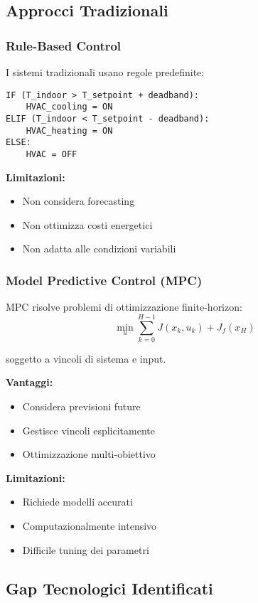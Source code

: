 \documentclass[12pt,a4paper,twoside]{report}
\begin{document}
\subsection{Approcci Tradizionali}

\subsubsection{Rule-Based Control}

I sistemi tradizionali usano regole predefinite:
\begin{lstlisting}
IF (T_indoor > T_setpoint + deadband):
    HVAC_cooling = ON
ELIF (T_indoor < T_setpoint - deadband):
    HVAC_heating = ON  
ELSE:
    HVAC = OFF
\end{lstlisting}

\textbf{Limitazioni:}
\begin{itemize}
    \item Non considera forecasting
    \item Non ottimizza costi energetici
    \item Non adatta alle condizioni variabili
\end{itemize}

\subsubsection{Model Predictive Control (MPC)}

MPC risolve problemi di ottimizzazione finite-horizon:
$$\min_{u} \sum_{k=0}^{H-1} J(x_k, u_k) + J_f(x_H)$$

soggetto a vincoli di sistema e input.

\textbf{Vantaggi:}
\begin{itemize}
    \item Considera previsioni future
    \item Gestisce vincoli esplicitamente
    \item Ottimizzazione multi-obiettivo
\end{itemize}

\textbf{Limitazioni:}
\begin{itemize}
    \item Richiede modelli accurati
    \item Computazionalmente intensivo
    \item Difficile tuning dei parametri
\end{itemize}

\subsection{Gap Tecnologici Identificati}
\end{document}
